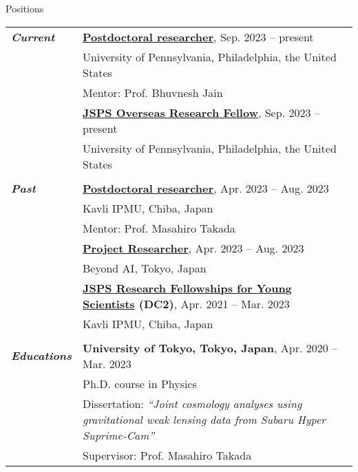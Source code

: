 \documentclass{../sty/resume} %
\newcommand{\heading}[1]{\hspace{-1.5em}\noindent\textbf{\textit{#1}}}
\begin{document}
\begin{rSection}{Positions}
  \centering
  \begin{tabular}{ @{} >{\bfseries}l @{\hspace{3ex}} p{}}
    \heading{Current}    & {\bf \href{https://www.physics.upenn.edu/people/sunao-sugiyama}{Postdoctoral researcher}}, \hfill Sep. 2023 -- present \\
                         & University of Pennsylvania, Philadelphia, the United States \\
                         & Mentor: Prof. Bhuvnesh Jain \\
                         & {\bf \href{https://www.jsps.go.jp/english/e-ab/index.html}{JSPS Overseas Research Fellow}}, \hfill Sep. 2023 -- present \\
                         & University of Pennsylvania, Philadelphia, the United States \\
                         & \\
    \heading{Past}       & {\bf \href{https://db.ipmu.jp/member/personal/5761en.html}{Postdoctoral researcher}}, \hfill Apr. 2023 -- Aug. 2023 \\
                         & Kavli IPMU, Chiba, Japan \\
                         & Mentor: Prof. Masahiro Takada \\
                         & {\bf \href{https://beyondai.jp/contents/projects/murayama/?lang=en}{Project Researcher}}, \hfill Apr. 2023 -- Aug. 2023 \\
                         & Beyond AI, Tokyo, Japan \\
                         & {\bf \href{https://www.jsps.go.jp/english/e-pd/}{JSPS Research Fellowships for Young Scientists} (DC2)}, \hfill Apr. 2021 -- Mar. 2023 \\
                         & Kavli IPMU, Chiba, Japan \\
                         & \\
    \heading{Educations} & {\bf University of Tokyo, Tokyo, Japan}, \hfill Apr. 2020 -- Mar. 2023 \\
                         & Ph.D. course in Physics \\
                         & Dissertation: \textit{``Joint cosmology analyses using gravitational weak lensing data from Subaru Hyper Suprime-Cam''} \\
                         & Supervisor: Prof. Masahiro Takada \\

\end{tabular}
\end{rSection}
\end{document}
